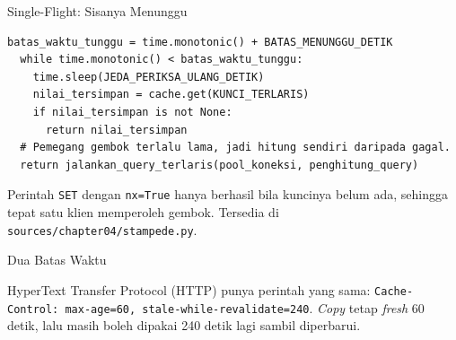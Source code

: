 \documentclass[aspectratio=169, table, 12pt]{beamer}
\begin{document}
\begin{frame}[fragile]{{\Large Single-Flight: Sisanya Menunggu}}
  \vspace{4pt}
\begin{lstlisting}[style=PythonStyle]
  batas_waktu_tunggu = time.monotonic() + BATAS_MENUNGGU_DETIK
  while time.monotonic() < batas_waktu_tunggu:
    time.sleep(JEDA_PERIKSA_ULANG_DETIK)
    nilai_tersimpan = cache.get(KUNCI_TERLARIS)
    if nilai_tersimpan is not None:
      return nilai_tersimpan
  # Pemegang gembok terlalu lama, jadi hitung sendiri daripada gagal.
  return jalankan_query_terlaris(pool_koneksi, penghitung_query)
\end{lstlisting}

  \vspace{4pt}
  {\footnotesize Perintah \texttt{SET} dengan \texttt{nx=True} hanya berhasil
  bila kuncinya belum ada, sehingga tepat satu klien memperoleh gembok.
  Tersedia di \texttt{sources/chapter04/stampede.py}.}
\end{frame}

\begin{frame}{{\Large Dua Batas Waktu}}
  \vspace{10pt}
  \centering

  \vspace{12pt}
  {\footnotesize HyperText Transfer Protocol (HTTP) punya perintah yang sama:
  \texttt{Cache-Control: max-age=60, stale-while-revalidate=240}. \textit{Copy} tetap \textit{fresh}
  60 detik, lalu masih boleh dipakai 240 detik lagi sambil diperbarui.}
\end{frame}
\end{document}
